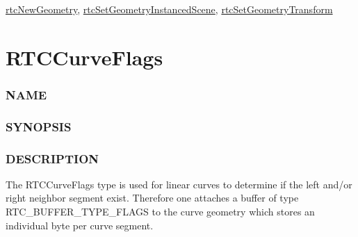 \hyperref[rtcnewgeometry]{rtcNewGeometry},
\hyperref[rtcsetgeometryinstancedscene]{rtcSetGeometryInstancedScene},
\hyperref[rtcsetgeometrytransform]{rtcSetGeometryTransform}

\pagebreak

\section{RTCCurveFlags}\label{rtccurveflags}

\subsubsection{NAME}\label{name}

\begin{Shaded}
\begin{Highlighting}[]
\OperatorTok{{-}}
\end{Highlighting}
\end{Shaded}

\subsubsection{SYNOPSIS}\label{synopsis}

\begin{Shaded}
\begin{Highlighting}[]

\OperatorTok{\{}
\OperatorTok{=} \OperatorTok{(} \OperatorTok{\textless{}\textless{}} \OperatorTok{),} 
\OperatorTok{=} \OperatorTok{(} \OperatorTok{\textless{}\textless{}} \OperatorTok{)} 
\OperatorTok{\};}
\end{Highlighting}
\end{Shaded}

\subsubsection{DESCRIPTION}\label{description}

The RTCCurveFlags type is used for linear curves to determine if the
left and/or right neighbor segment exist. Therefore one attaches a
buffer of type RTC\_BUFFER\_TYPE\_FLAGS to the curve geometry which
stores an individual byte per curve segment.

